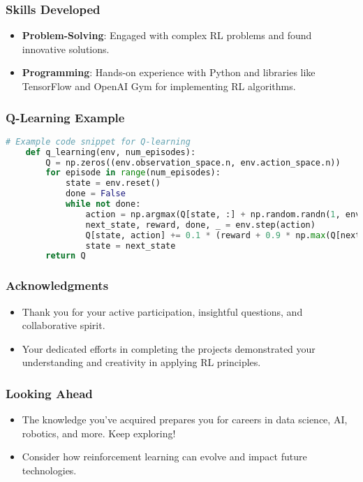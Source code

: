 \documentclass[aspectratio=169]{beamer}
\begin{document}
\begin{frame}
    \frametitle{Skills Developed}
    \begin{itemize}
        \item \textbf{Problem-Solving}: Engaged with complex RL problems and found innovative solutions.
        \item \textbf{Programming}: Hands-on experience with Python and libraries like TensorFlow and OpenAI Gym for implementing RL algorithms.
    \end{itemize}
\end{frame}

\begin{frame}[fragile]
    \frametitle{Q-Learning Example}
    \begin{lstlisting}[language=Python]
    # Example code snippet for Q-learning
    def q_learning(env, num_episodes):
        Q = np.zeros((env.observation_space.n, env.action_space.n))
        for episode in range(num_episodes):
            state = env.reset()
            done = False
            while not done:
                action = np.argmax(Q[state, :] + np.random.randn(1, env.action_space.n) * (1. / (episode + 1)))
                next_state, reward, done, _ = env.step(action)
                Q[state, action] += 0.1 * (reward + 0.9 * np.max(Q[next_state, :]) - Q[state, action])
                state = next_state
        return Q
    \end{lstlisting}
\end{frame}

\begin{frame}
    \frametitle{Acknowledgments}
    \begin{itemize}
        \item Thank you for your active participation, insightful questions, and collaborative spirit.
        \item Your dedicated efforts in completing the projects demonstrated your understanding and creativity in applying RL principles.
    \end{itemize}
\end{frame}

\begin{frame}
    \frametitle{Looking Ahead}
    \begin{itemize}
        \item The knowledge you’ve acquired prepares you for careers in data science, AI, robotics, and more. Keep exploring!
        \item Consider how reinforcement learning can evolve and impact future technologies.
    \end{itemize}
\end{frame}
\end{document}
